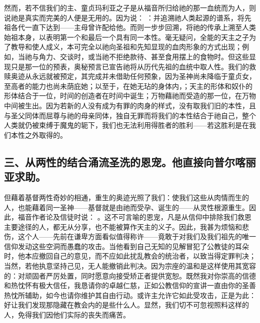 然而，若不信我们的主、童贞玛利亚之子是从福音所归给祂的那一血统而为人，则说祂是真实而完美的人便是无用的。因为说： ：并追溯祂人类起源的谱系，将先祖各代一直下达到——主母曾许配给他。而则一步步回溯，将祂的传承上溯至人类始祖本身，以表明第一个和最后一个具有同一本性。毫无疑问，全能的天主之子为了教导和使人成义，本可完全以祂向圣祖和先知显现的血肉形象的方式出现；例如，当祂与角力、交谈时，或当祂不拒绝款待、甚至食用摆上的食物时。但这些显现只是那一位的预表，奥秘预言已宣告祂将从历代先祖的血统中取人性。我们的救赎奥迹从永远就被预定，其完成并未借助任何预象，因为圣神尚未降临于童贞女，至高者的能力也尚未荫庇她；以至于，在她无玷的身体内，；天主的形体和奴仆的形体结合于一位，时间的创造者在时间中诞生；万物藉祂而受造的那一位，在万物中间被生出。因为若新的人没有成为有罪的肉身的样式，没有取我们旧的本性，且与圣父同体而屈尊与祂的母亲同体，独自无罪而将我们的本性结合于祂自己，整个人类就仍被束缚于魔鬼的轭下，我们也无法利用得胜者的胜利——若这胜利是在我们本性之外取得的。\par


\subsection{三、从两性的结合涌流圣洗的恩宠。他直接向普尔喀丽亚求助。}

但藉着基督两性奇妙的相通，重生的奥迹光照了我们：使我们这些从肉情而生的人，也能藉着同一圣神——基督就是由祂而受孕、诞生的——从灵性根源重生。因此，福音作者论及信徒时说： 。这不可言喻的恩宠，凡是从信仰中排除我们救恩主要途径的人，都无从分享，也不能被算作天主的义子。因此，我甚为烦恼和悲伤，这个人——先前在谦卑方面看似值得称许——竟敢于对我们及我们祖先的唯一信仰发动这些空洞而愚蠢的攻击。当他看到自己无知的见解冒犯了公教徒的耳朵时，他本应撤回自己的意见，而不应如此扰乱教会的统治者，以致当得定罪判决；当然，若他执意坚持己见，无人能撤销此判决。因为宗座的温和是这样使用其宽容的：对顽固者严厉处置，同时愿意向接受矫正者提供宽恕。既然我对你崇高的信德和热忱怀有极大信任，我恳请你的卓越仁慈，正如公教信仰的宣讲一直由你的圣善热忱所辅助，如今也请你维护其自由行动。或许主允许它如此受攻击，正是为此：好让我们发现那隐藏在教会内的是些什么人。显然，我们切不可忽视照料这样的人，免得我们因他们实际的丧失而痛苦。\par

